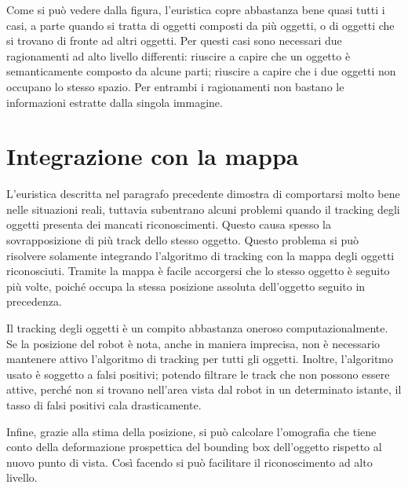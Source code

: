 Come si può vedere dalla figura, %
l'euristica copre abbastanza bene quasi tutti i casi, a parte quando si tratta di oggetti composti da più oggetti, o di oggetti che si trovano di fronte ad altri oggetti. Per questi casi sono necessari due ragionamenti ad alto livello differenti: riuscire a capire che un oggetto è semanticamente composto da alcune parti; riuscire a capire che i due oggetti non occupano lo stesso spazio. Per entrambi i ragionamenti non bastano le informazioni estratte dalla singola immagine.

\section{Integrazione con la mappa}
L'euristica descritta nel paragrafo precedente dimostra di comportarsi molto bene nelle situazioni reali, tuttavia subentrano alcuni problemi quando il tracking degli oggetti presenta dei mancati riconoscimenti. Questo causa spesso la sovrapposizione di più track dello stesso oggetto. Questo problema si può risolvere solamente integrando l'algoritmo di tracking con la mappa degli oggetti riconosciuti. Tramite la mappa è facile accorgersi che lo stesso oggetto è seguito più volte, poiché occupa la stessa posizione assoluta dell'oggetto seguito in precedenza.

Il tracking degli oggetti è un compito abbastanza oneroso computazionalmente. Se la posizione del robot è nota, anche in maniera imprecisa, non è necessario mantenere attivo l'algoritmo di tracking per tutti gli oggetti. Inoltre, l'algoritmo usato è soggetto a falsi positivi; potendo filtrare le track che non possono essere attive, perché non si trovano nell'area vista dal robot in un determinato istante, il tasso di falsi positivi cala drasticamente.

Infine, grazie alla stima della posizione, si può calcolare l'omografia che tiene conto della deformazione prospettica del bounding box dell'oggetto rispetto al nuovo punto di vista. Così facendo si può facilitare il riconoscimento ad alto livello.

